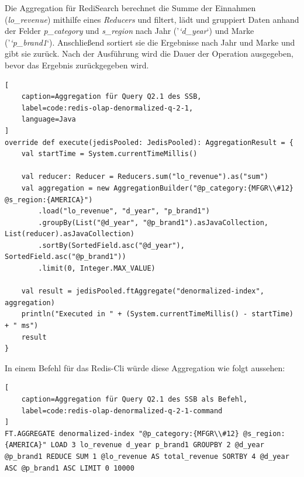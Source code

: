 Die Aggregation für RediSearch berechnet die Summe der Einnahmen (\emph{lo\_revenue}) mithilfe eines \emph{Reducers} und filtert, lädt und gruppiert Daten anhand der Felder \emph{p\_category} und \emph{s\_region} nach Jahr ('\emph{`d\_year}`) und Marke ('\emph{`p\_brand1}`). Anschließend sortiert sie die Ergebnisse nach Jahr und Marke und gibt sie zurück. Nach der Ausführung wird die Dauer der Operation ausgegeben, bevor das Ergebnis zurückgegeben wird.

\begin{lstlisting}[
    caption=Aggregation für Query Q2.1 des SSB,
    label=code:redis-olap-denormalized-q-2-1,
    language=Java
]
override def execute(jedisPooled: JedisPooled): AggregationResult = {
	val startTime = System.currentTimeMillis()

	val reducer: Reducer = Reducers.sum("lo_revenue").as("sum")
	val aggregation = new AggregationBuilder("@p_category:{MFGR\\#12} @s_region:{AMERICA}")
		.load("lo_revenue", "d_year", "p_brand1")
		.groupBy(List("@d_year", "@p_brand1").asJavaCollection, List(reducer).asJavaCollection)
		.sortBy(SortedField.asc("@d_year"), SortedField.asc("@p_brand1"))
		.limit(0, Integer.MAX_VALUE)

	val result = jedisPooled.ftAggregate("denormalized-index", aggregation)
	println("Executed in " + (System.currentTimeMillis() - startTime) + " ms")
	result
}
\end{lstlisting}

In einem Befehl für das Redis-Cli würde diese Aggregation wie folgt aussehen:
\begin{lstlisting}[
    caption=Aggregation für Query Q2.1 des SSB als Befehl,
    label=code:redis-olap-denormalized-q-2-1-command
]
FT.AGGREGATE denormalized-index "@p_category:{MFGR\\#12} @s_region:{AMERICA}" LOAD 3 lo_revenue d_year p_brand1 GROUPBY 2 @d_year @p_brand1 REDUCE SUM 1 @lo_revenue AS total_revenue SORTBY 4 @d_year ASC @p_brand1 ASC LIMIT 0 10000
\end{lstlisting}


